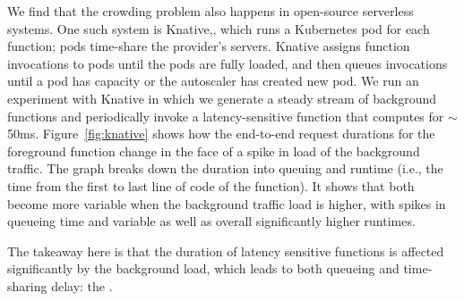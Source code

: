 We find that the crowding problem also happens in open-source serverless
systems. One such system is Knative,\cite{knative}, which runs a Kubernetes pod
for each function; pods time-share the provider's servers. Knative assigns
function invocations to pods until the pods are fully loaded, and then queues
invocations until a pod has capacity or the autoscaler has created new pod. We
run an experiment with Knative in which we generate a steady stream of
background functions and periodically invoke a latency-sensitive function that
computes for $\sim$50ms. Figure~\ref{fig:knative} shows how the end-to-end
request durations for the foreground function change in the face of a spike in
load of the background traffic. The graph breaks down the duration into queuing
and runtime (i.e., the time from the first to last line of code of the
function). It shows that both become more variable when the background traffic
load is higher, with spikes in queueing time and variable as well as overall
significantly higher runtimes. 

The takeaway here is that the duration of latency sensitive functions is
affected significantly by the background load, which leads to both queueing and
time-sharing delay: the \problem{}.
